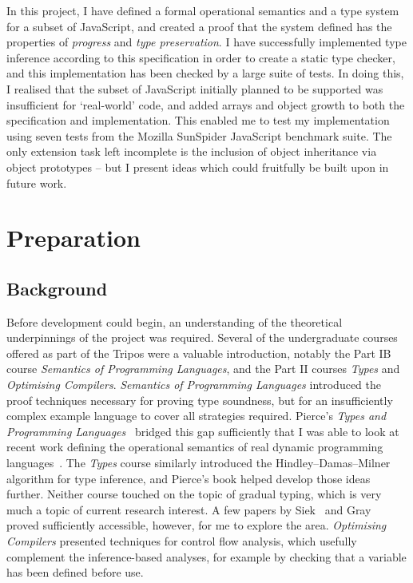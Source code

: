 \documentclass[12pt,a4paper,twoside,openright]{report}
\begin{document}
In this project, I have defined a formal operational semantics and a type
system for a subset of JavaScript, and created a proof that the system defined
has the properties of \textit{progress} and \textit{type preservation}. I have
successfully implemented type inference according to this specification in
order to create a static type checker, and this implementation has been checked
by a large suite of tests. In doing this, I realised that the subset of
JavaScript initially planned to be supported was insufficient for `real-world'
code, and added arrays and object growth to both the specification and
implementation. This enabled me to test my implementation using seven tests
from the Mozilla SunSpider JavaScript benchmark suite. The only extension task
left incomplete is the inclusion of object inheritance via object prototypes --
but I present ideas which could fruitfully be built upon in future work.

\chapter{Preparation}\label{preparation} \section{Background}

Before development could begin, an understanding of the theoretical
underpinnings of the project was required. Several of the undergraduate courses
offered as part of the Tripos were a valuable introduction, notably the Part IB
course \textit{Semantics of Programming Languages}, and the Part II courses
\textit{Types} and \textit{Optimising Compilers}. \textit{Semantics of
Programming Languages} introduced the proof techniques necessary for proving
type soundness, but for an insufficiently complex example language to cover all
strategies required.  Pierce's \textit{Types and Programming
Languages}~\cite{pierce} bridged this gap sufficiently that I was able to look
at recent work defining the operational semantics of real dynamic programming
languages~\cite{pythonOpSem}.  The \textit{Types} course similarly introduced
the Hindley--Damas--Milner algorithm for type inference, and Pierce's book
helped develop those ideas further. Neither course touched on the topic of
gradual typing, which is very much a topic of current research interest. A few
papers by Siek~\cite{gradSiek, gradSiek2} and Gray~\cite{gradGray} proved
sufficiently accessible, however, for me to explore the area.
\textit{Optimising Compilers} presented techniques for control flow analysis,
which usefully complement the inference-based analyses, for example by checking
that a variable has been defined before use.
\end{document}
